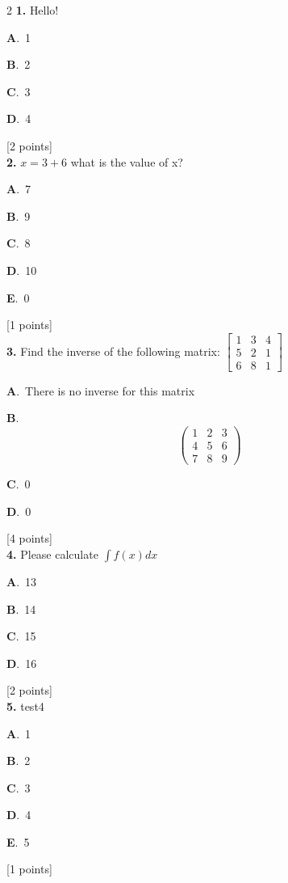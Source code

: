 \documentclass[12pt]{article}
\newcommand{\choice}[3]{%
  \noindent\textbf{#1}.~#2\hfill#3\par\vspace{0.25em}
}
\begin{document}
\begin{multicols}{2}
\noindent \textbf{\textenglish{1.}} {\textenglish{Hello!}}

\noindent\choice{A}{{\textenglish{1}}}{}
\noindent\choice{B}{{\textenglish{2}}}{}
\noindent\choice{C}{{\textenglish{3}}}{}
\noindent\choice{D}{{\textenglish{4}}}{}
\hfill {\textenglish{[2 points]}}\\[0.5em]

\noindent \textbf{\textenglish{2.}} \(x=3+6 \){\textenglish{ what is the value of x?}}

\noindent\choice{A}{{\textenglish{7}}}{}
\noindent\choice{B}{{\textenglish{9}}}{}
\noindent\choice{C}{{\textenglish{8}}}{}
\noindent\choice{D}{{\textenglish{10}}}{}
\noindent\choice{E}{{\textenglish{0}}}{}
\hfill {\textenglish{[1 points]}}\\[0.5em]

\noindent \textbf{\textenglish{3.}} {\textenglish{Find the inverse of the following matrix: }}\(\begin{bmatrix} 1 & 3 & 4 \\ 5 & 2 & 1 \\ 6 & 8 & 1 \end{bmatrix}\)

\noindent\choice{A}{{\textenglish{There is no inverse for this matrix}}}{}
\noindent\choice{B}{\[\begin{pmatrix} 1 & 2 & 3 \\ 4 & 5 & 6 \\ 7 & 8 & 9  \end{pmatrix}\]}{}
\noindent\choice{C}{{\textenglish{0}}}{}
\noindent\choice{D}{{\textenglish{0}}}{}
\hfill {\textenglish{[4 points]}}\\[0.5em]

\noindent \textbf{\textenglish{4.}} {\textenglish{Please calculate }}\(\int f(x)dx\)

\noindent\choice{A}{{\textenglish{13}}}{}
\noindent\choice{B}{{\textenglish{14}}}{}
\noindent\choice{C}{{\textenglish{15}}}{}
\noindent\choice{D}{{\textenglish{16}}}{}
\hfill {\textenglish{[2 points]}}\\[0.5em]

\noindent \textbf{\textenglish{5.}} {\textenglish{test4}}

\noindent\choice{A}{{\textenglish{1}}}{}
\noindent\choice{B}{{\textenglish{2}}}{}
\noindent\choice{C}{{\textenglish{3}}}{}
\noindent\choice{D}{{\textenglish{4}}}{}
\noindent\choice{E}{{\textenglish{5}}}{}
\hfill {\textenglish{[1 points]}}\\[0.5em]


\end{multicols}
\end{document}
